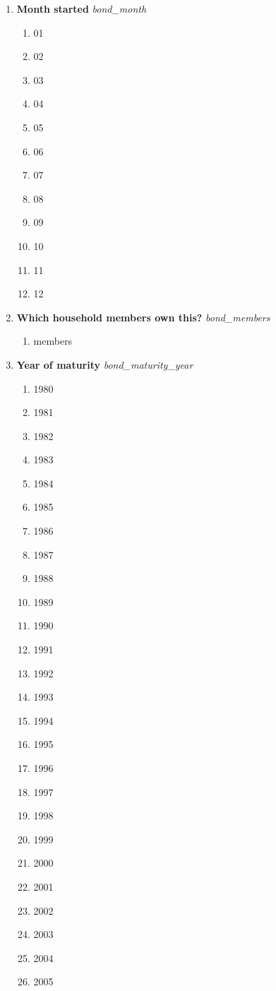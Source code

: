 \documentclass{article}
\begin{document}
\begin{enumerate}
\begin{enumerate}[label*=\arabic*.]
\item {\bfseries Month started}\emph{ bond\_month } 
\begin{enumerate} 
\item 01 
\item 02 
\item 03 
\item 04 
\item 05 
\item 06 
\item 07 
\item 08 
\item 09 
\item 10 
\item 11 
\item 12 
\end{enumerate} 
\item {\bfseries Which household members own this?}\emph{ bond\_members } 
\begin{enumerate} 
\item members 
\end{enumerate} 
\item {\bfseries Year of maturity}\emph{ bond\_maturity\_year } 
\begin{enumerate} 
\item 1980 
\item 1981 
\item 1982 
\item 1983 
\item 1984 
\item 1985 
\item 1986 
\item 1987 
\item 1988 
\item 1989 
\item 1990 
\item 1991 
\item 1992 
\item 1993 
\item 1994 
\item 1995 
\item 1996 
\item 1997 
\item 1998 
\item 1999 
\item 2000 
\item 2001 
\item 2002 
\item 2003 
\item 2004 
\item 2005 

\end{enumerate}
\end{enumerate}
\end{enumerate}
\end{document}

